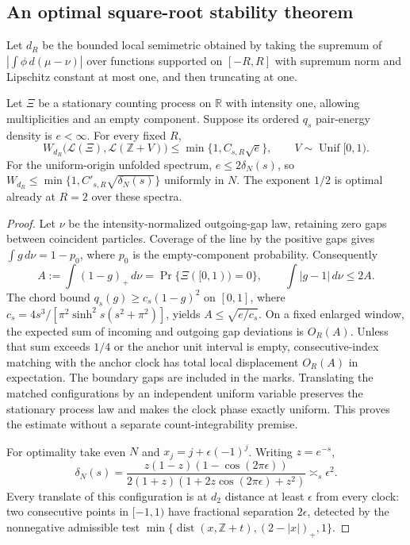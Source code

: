 \subsection{An optimal square-root stability theorem}
Let $d_R$ be the bounded local semimetric obtained by taking the supremum
of $|\int\phi\,d(\mu-\nu)|$ over functions supported on $[-R,R]$ with
supremum norm and Lipschitz constant at most one, and then truncating at one.
\begin{theorem}
Let $\Xi$ be a stationary counting process on $\mathbb R$ with intensity
one, allowing multiplicities and an empty component. Suppose its ordered
$q_s$ pair-energy density is $e<\infty$. For every fixed $R$,
\[
 W_{d_R}\bigl(\mathcal L(\Xi),\mathcal L(\mathbb Z+V)\bigr)
       \le \min\{1,C_{s,R}\sqrt e\},
 \qquad V\sim\operatorname{Unif}[0,1).
\]
For the uniform-origin unfolded spectrum, $e\le2\delta_N(s)$, so
$W_{d_R}\le\min\{1,C'_{s,R}\sqrt{\delta_N(s)}\}$ uniformly in $N$.
The exponent $1/2$ is optimal already at $R=2$ over these spectra.
\end{theorem}
\begin{proof}
Let $\nu$ be the intensity-normalized outgoing-gap law, retaining zero
gaps between coincident particles. Coverage of the line by the positive
gaps gives $\int g\,d\nu=1-p_0$, where $p_0$ is the empty-component
probability. Consequently
\[
 A:=\int(1-g)_+\,d\nu
   =\Pr\{\Xi([0,1))=0\},\qquad
 \int|g-1|\,d\nu\le2A.
\]
The chord bound $q_s(g)\ge c_s(1-g)^2$ on $[0,1]$, where
$c_s=4s^3/[\pi^2\sinh^2s(s^2+\pi^2)]$, yields $A\le\sqrt{e/c_s}$.
On a fixed enlarged window, the expected sum of incoming and outgoing
gap deviations is $O_R(A)$. Unless that sum exceeds $1/4$ or the anchor
unit interval is empty, consecutive-index matching with the anchor clock
has total local displacement $O_R(A)$ in expectation. The boundary gaps
are included in the marks. Translating the matched configurations by an
independent uniform variable preserves the stationary process law and
makes the clock phase exactly uniform. This proves the estimate without
a separate count-integrability premise.

For optimality take even $N$ and $x_j=j+\epsilon(-1)^j$. Writing $z=e^{-s}$,
\[
 \delta_N(s)=\frac{z(1-z)(1-\cos(2\pi\epsilon))}
 {2(1+z)(1+2z\cos(2\pi\epsilon)+z^2)}\asymp_s\epsilon^2.
\]
Every translate of this configuration is at $d_2$ distance at least
$\epsilon$ from every clock: two consecutive points in $[-1,1)$ have
fractional separation $2\epsilon$, detected by the nonnegative admissible
test $\min\{\operatorname{dist}(x,\mathbb Z+t),(2-|x|)_+,1\}$.
\end{proof}

